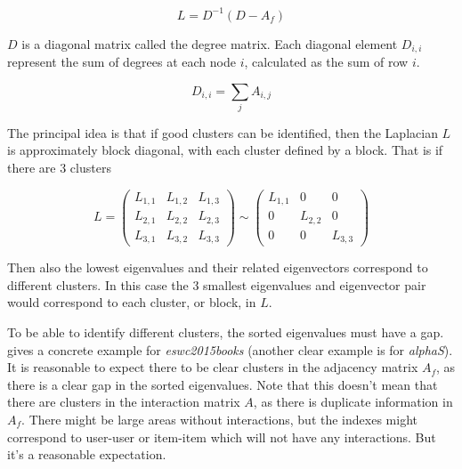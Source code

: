 \begin{equation}
    L = D^{-1}( D - A_f )
\end{equation}

$D$ is a diagonal matrix called the degree matrix. Each diagonal element $D_{i, i}$ represent the sum of degrees at each node $i$, calculated as the sum of row $i$.

\begin{equation}
    D_{i, i} = \sum_j A_{i, j}
\end{equation}

The principal idea is that if good clusters can be identified, then the Laplacian $L$ is approximately block diagonal, with each cluster defined by a block. That is if there are 3 clusters

\begin{equation}
    L =
    \begin{pmatrix}
        L_{1, 1} & L_{1, 2} & L_{1, 3} \\
        L_{2, 1} & L_{2, 2} & L_{2, 3} \\
        L_{3, 1} & L_{3, 2} & L_{3, 3}
    \end{pmatrix}
    \sim
    \begin{pmatrix}
        L_{1, 1} & 0         & 0        \\
        0        & L_{2, 2}  & 0        \\
        0        & 0         & L_{3, 3}
    \end{pmatrix}
\end{equation}

Then also the lowest eigenvalues and their related eigenvectors correspond to different clusters. In this case the 3 smallest eigenvalues and eigenvector pair would correspond to each cluster, or block, in $L$.

To be able to identify different clusters, the sorted eigenvalues must have a gap.  gives a concrete example for \textit{eswc2015books} (another clear example is  for \textit{alphaS}). It is reasonable to expect there to be clear clusters in the adjacency matrix $A_f$, as there is a clear gap in the sorted eigenvalues. Note that this doesn't mean that there are clusters in the interaction matrix $A$, as there is duplicate information in $A_f$. There might be large areas without interactions, but the indexes might correspond to user-user or item-item which will not have any interactions. But it's a reasonable expectation.

